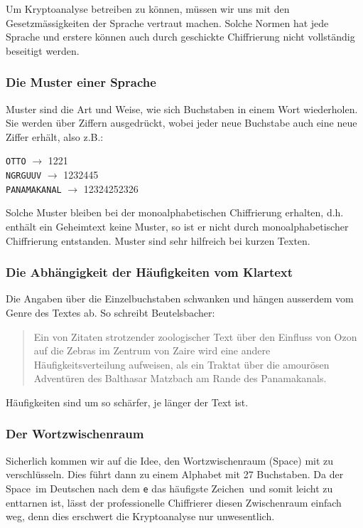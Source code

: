 \documentclass[%
11pt,%
twoside,%
titlepage,%
german,%
headsepline%
]{scrartcl}
\begin{document}
Um Kryptoanalyse betreiben zu k\"onnen, müssen wir uns mit den Gesetzmässigkeiten der Sprache vertraut machen. Solche Normen hat jede Sprache und erstere k\"onnen auch durch geschickte Chiffrierung nicht vollständig beseitigt werden.

\subsubsection{Die Muster einer Sprache}

Muster sind die Art und Weise, wie sich Buchstaben in einem Wort wiederholen. Sie werden über Ziffern ausgedrückt, wobei jeder neue Buchstabe auch eine neue Ziffer erhält, also z.B.:
\begin{center}
\texttt{OTTO} $\longrightarrow$ 1221\\
\texttt{NGRGUUV} $\longrightarrow$ 1232445\\
\texttt{PANAMAKANAL} $\longrightarrow$ 12324252326
\end{center}
Solche Muster bleiben bei der monoalphabetischen Chiffrierung erhalten, d.h. enthält ein Geheimtext keine Muster, so ist er nicht durch monoalphabetischer Chiffrierung entstanden. Muster sind sehr hilfreich bei kurzen Texten.

\subsubsection{Die Abhängigkeit der Häufigkeiten vom Klartext}

Die Angaben über die Einzelbuchstaben schwanken und hängen ausserdem vom Genre des Textes ab. So schreibt Beutelsbacher:

\begin{quote}
\glqq Ein von Zitaten strotzender zoologischer Text über den Einfluss von Ozon auf die Zebras im Zentrum von Zaire wird eine andere Häufigkeitsverteilung aufweisen, als ein Traktat über die amourösen Adventüren des Balthasar Matzbach am Rande des Panamakanals.\grqq
\end{quote}

Häufigkeiten sind um so schärfer, je länger der Text ist.

\subsubsection{Der Wortzwischenraum}

Sicherlich kommen wir auf die Idee, den Wortzwischenraum (Space) mit zu verschlüsseln. Dies führt dann zu einem Alphabet mit 27 Buchstaben. Da der \glqq Space\grqq\ im Deutschen nach dem \texttt{e} das häufigste \glqq Zeichen\grqq\ und somit leicht zu enttarnen ist, lässt der professionelle Chiffrierer diesen Zwischenraum einfach weg, denn dies erschwert die Kryptoanalyse nur unwesentlich.
\end{document}
